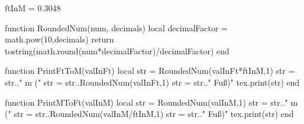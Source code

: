 \begin{luacode}
	ftInM = 0.3048
	
	function RoundedNum(num, decimals)
		local decimalFactor = math.pow(10,decimals)
		return tostring(math.round(num*decimalFactor)/decimalFactor)
	end
	
	function PrintFtToM(valInFt)
		local str = RoundedNum(valInFt*ftInM,1)
		str = str.." m ("
		str = str..RoundedNum(valInFt,1)
		str = str.." Fuß)"
		tex.print(str)
	end
	
	function PrintMToFt(valInM)
		local str = RoundedNum(valInM,1)
		str = str.." m ("
		str = str..RoundedNum(valInM/ftInM,1)
		str = str.." Fuß)"
		tex.print(str)
	end
\end{luacode}

\newcommand{\ft}[1]{
	\directlua{PrintFtToM(#1)}
}

\newcommand{\metre}[1]{
	\directlua{PrintMToFt(#1)}
}
